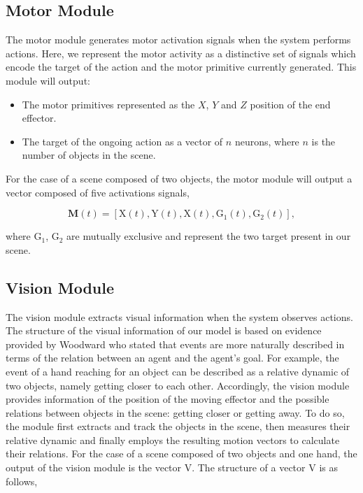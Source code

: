 \documentclass[conference]{IEEEtran}
\begin{document}
\subsection{Motor Module}
The motor module generates motor activation signals when the system performs actions. Here, we represent the motor activity as a distinctive set of signals which encode the target of the action and the motor primitive currently generated. This module will output:
\begin{itemize}
\item The motor primitives represented as the $X$, $Y$ and $Z$ position of the end effector.
\item The target of the ongoing action as a vector of $n$ neurons, where $n$ is the number of objects in the scene.
\end{itemize}
For the case of a scene composed of two objects, the motor module will output a vector  composed of five activations signals,

\begin{equation}
	\textbf{M}(t)=[\text{X}(t), \text{Y}(t), \text{X}(t), \text{G}_{1}(t), \text{G}_{2}(t)],
\end{equation}

where \(\text{G}_{1}\), \(\text{G}_{2}\)  are mutually exclusive and represent the two target present in our scene.

\subsection{Vision Module}
The vision module extracts visual information when the system observes actions. The structure of the visual information of our model is based on evidence provided by Woodward \cite{woodward2009infants} who stated that events are more naturally described in terms of the relation between an agent and the agent's goal. For example, the event of a hand reaching for an object can be described as a relative dynamic of two objects, namely getting closer to each other. Accordingly, the vision module provides information of the position of the moving effector and the possible relations between objects in the scene: getting closer or getting away. To do so, the module first extracts and track the objects in the scene, then measures their relative dynamic and finally employs the resulting motion vectors to calculate their relations. For the case of a scene composed of two objects and one hand, the output of the vision module is the vector \(\text{V}\). The structure of a vector \(\text{V}\) is as follows,
\end{document}
